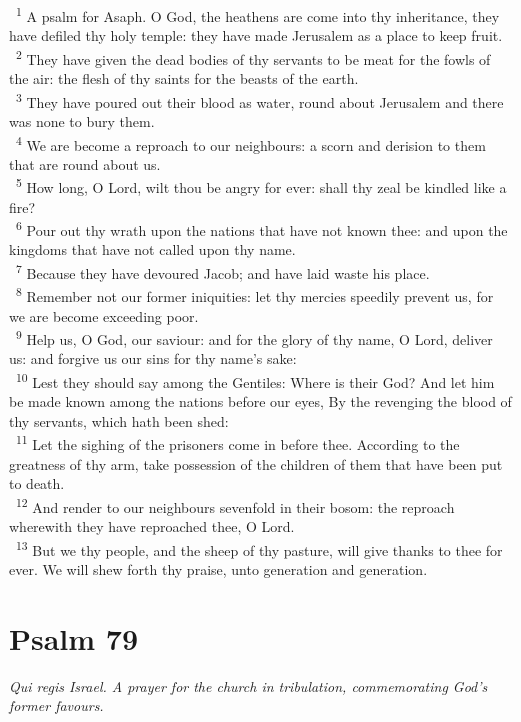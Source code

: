 \documentclass[a5paper,12pt]{article}
\begin{document}
\begin{multicols*}{2}
~\textsuperscript{1} A psalm for Asaph. O God, the heathens are come into thy inheritance, they have defiled thy holy temple: they have made Jerusalem as a place to keep fruit.\\
~\textsuperscript{2} They have given the dead bodies of thy servants to be meat for the fowls of the air: the flesh of thy saints for the beasts of the earth.\\
~\textsuperscript{3} They have poured out their blood as water, round about Jerusalem and there was none to bury them.\\
~\textsuperscript{4} We are become a reproach to our neighbours: a scorn and derision to them that are round about us.\\
~\textsuperscript{5} How long, O Lord, wilt thou be angry for ever: shall thy zeal be kindled like a fire?\\
~\textsuperscript{6} Pour out thy wrath upon the nations that have not known thee: and upon the kingdoms that have not called upon thy name.\\
~\textsuperscript{7} Because they have devoured Jacob; and have laid waste his place.\\
~\textsuperscript{8} Remember not our former iniquities: let thy mercies speedily prevent us, for we are become exceeding poor.\\
~\textsuperscript{9} Help us, O God, our saviour: and for the glory of thy name, O Lord, deliver us: and forgive us our sins for thy name's sake:\\
~\textsuperscript{10} Lest they should say among the Gentiles: Where is their God? And let him be made known among the nations before our eyes, By the revenging the blood of thy servants, which hath been shed:\\
~\textsuperscript{11} Let the sighing of the prisoners come in before thee. According to the greatness of thy arm, take possession of the children of them that have been put to death.\\
~\textsuperscript{12} And render to our neighbours sevenfold in their bosom: the reproach wherewith they have reproached thee, O Lord.\\
~\textsuperscript{13} But we thy people, and the sheep of thy pasture, will give thanks to thee for ever. We will shew forth thy praise, unto generation and generation.\\

\section{Psalm 79}
\label{sec:orgddf963f}
\emph{Qui regis Israel. A prayer for the church in tribulation, commemorating God's former favours.}\\


\end{multicols*}
\end{document}

